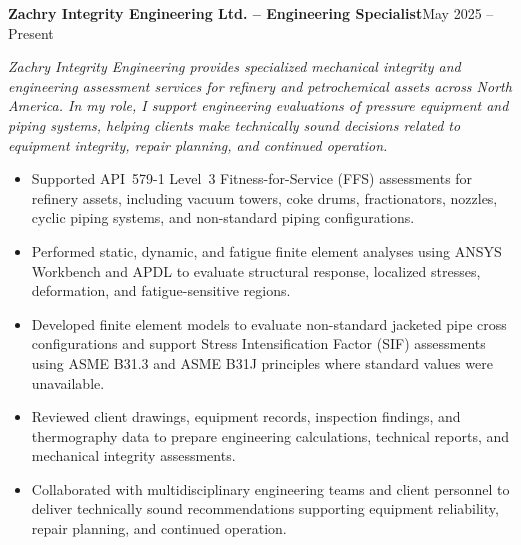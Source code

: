 \documentclass[10pt, letterpaper]{article}
\newcommand{\jobheader}[3]{\vspace{5pt}\textbf{#1 {--} #2}\hfill{\small\color{black}#3}\par\vspace{1pt}}
\newcommand{\jobcontext}[1]{{\small\textit{#1}}\vspace{3pt}\par}
\begin{document}
\jobheader{Zachry Integrity Engineering Ltd.}{Engineering Specialist}{May 2025 -- Present}
\jobcontext{Zachry Integrity Engineering provides specialized mechanical integrity and engineering assessment services for refinery and petrochemical assets across North America. In my role, I support engineering evaluations of pressure equipment and piping systems, helping clients make technically sound decisions related to equipment integrity, repair planning, and continued operation.}
\begin{itemize}
  \item Supported API~579-1 Level~3 Fitness-for-Service (FFS) assessments for refinery assets, including vacuum towers, coke drums, fractionators, nozzles, cyclic piping systems, and non-standard piping configurations.
  \item Performed static, dynamic, and fatigue finite element analyses using ANSYS Workbench and APDL to evaluate structural response, localized stresses, deformation, and fatigue-sensitive regions.
  \item Developed finite element models to evaluate non-standard jacketed pipe cross configurations and support Stress Intensification Factor (SIF) assessments using ASME B31.3 and ASME B31J principles where standard values were unavailable.
  \item Reviewed client drawings, equipment records, inspection findings, and thermography data to prepare engineering calculations, technical reports, and mechanical integrity assessments.
  \item Collaborated with multidisciplinary engineering teams and client personnel to deliver technically sound recommendations supporting equipment reliability, repair planning, and continued operation.
\end{itemize}

\vspace{3pt}
\end{document}
